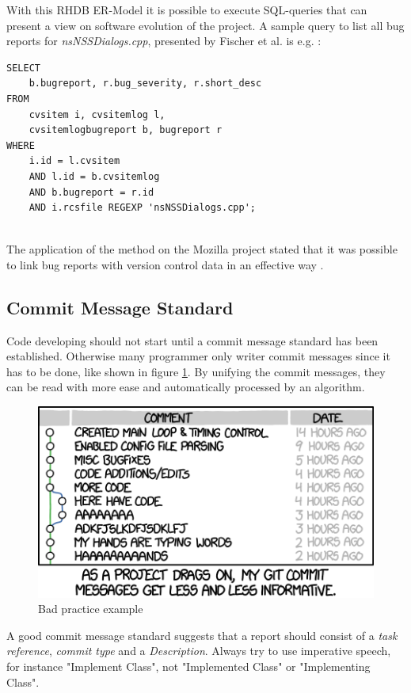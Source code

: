 With this RHDB ER-Model it is possible to execute SQL-queries that can present a view on software evolution of the project. A sample query to list all bug reports for \textit{nsNSSDialogs.cpp}, presented by Fischer et al. is e.g. \cite{fischer2003populating}:

\begin{verbatim}
SELECT
	b.bugreport, r.bug_severity, r.short_desc
FROM
	cvsitem i, cvsitemlog l,
	cvsitemlogbugreport b, bugreport r
WHERE 	
	i.id = l.cvsitem
	AND l.id = b.cvsitemlog
	AND b.bugreport = r.id
	AND i.rcsfile REGEXP 'nsNSSDialogs.cpp';
	
\end{verbatim}

The application of the method on the Mozilla project stated that it was possible to link bug reports with version control data in an effective way \cite{fischer2003populating}. 

\subsection{Commit Message Standard}
Code developing should not start until a commit message standard has been established. Otherwise many programmer only writer commit messages since it has to be done, like shown in figure \ref{git_commit}. By unifying the commit messages, they can be read with more ease and automatically processed by an algorithm. \\
\begin{figure}[b]
\includegraphics[scale=0.6666]{images/git_commit.png}
\caption{Bad practice example}
\label{git_commit}
\end{figure}
A good commit message standard suggests that a report should consist of a \textit{task reference}, \textit{commit type} and a \textit{Description}. Always try to use imperative speech, for instance "Implement Class", not "Implemented Class" or "Implementing Class". 
